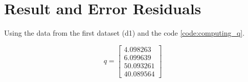 \section{Result and Error Residuals}

Using the data from the first dataset (d1) and the code \ref{code:computing_q}.



        
        
 

\begin{equation}
q = 
\left[
\begin{array}{c}
4.098263 \\
6.099639 \\
50.093261 \\
40.089564
\end{array}
\right]
\end{equation}